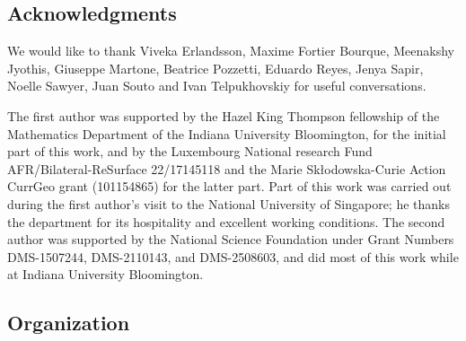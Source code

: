 \documentclass[11pt]{amsart}
\numberwithin{equation}{section}
\numberwithin{figure}{section}
\theoremstyle{definition}
\theoremstyle{plain}
\begin{document}
\subsection{Acknowledgments}
\label{sec:acknowledgments}

We would like to thank Viveka Erlandsson, Maxime Fortier Bourque, Meenakshy Jyothis, Giuseppe Martone, Beatrice Pozzetti, Eduardo Reyes, Jenya Sapir, Noelle Sawyer, Juan Souto and Ivan Tel\-pu\-khov\-skiy for useful conversations.

The first author was supported by the Hazel King Thompson fellowship
of the Mathematics Department of the Indiana University Bloomington,
for the initial part of this work, and by the Luxembourg National
research Fund AFR/Bilateral-ReSurface 22/17145118 and the Marie
Skłodowska-Curie Action CurrGeo grant (101154865) for the latter part.
Part of this work was carried out during the first author’s visit to
the National University of Singapore; he thanks the department for its
hospitality and excellent working conditions. The second author was
supported by the National Science
Foundation under Grant Numbers DMS-1507244, DMS-2110143, and DMS-2508603, and did
most of this work while at Indiana University Bloomington.

\subsection{Organization}
\label{sec:organization}
\end{document}
